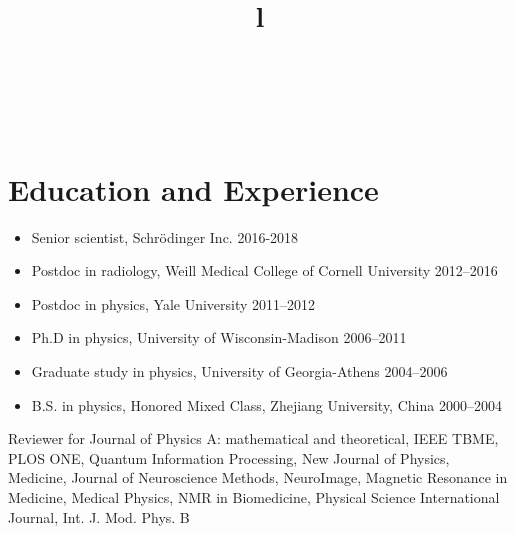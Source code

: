 \documentclass[centered,11pt,overlapped]{res}
\begin{document}
\begin{resume}
\begin{format}
\title{l}\\
\\
\end{format}


\section{\sc Education and Experience}

\begin{itemize}
\item Senior scientist, Schr\"odinger Inc. \hfill 2016-2018
\item Postdoc in radiology, Weill Medical College of Cornell University \hfill 2012--2016 
\item Postdoc in physics, Yale University \hfill 2011--2012
\item {Ph.D in physics, University of Wisconsin-Madison} 
\hfill {2006--2011} 
\item {Graduate study in physics, University of Georgia-Athens} \hfill {2004--2006}  
\item {B.S. in physics, Honored Mixed Class},  
{Zhejiang University, China } \hfill {2000--2004}  
\end{itemize}

Reviewer for Journal of Physics A: mathematical and theoretical, IEEE TBME, PLOS ONE, Quantum Information Processing, New Journal of Physics, Medicine, Journal of Neuroscience Methods, NeuroImage, Magnetic Resonance in Medicine, Medical Physics, NMR in Biomedicine, Physical Science International Journal, Int. J. Mod. Phys. B



\end{resume}
\end{document}
